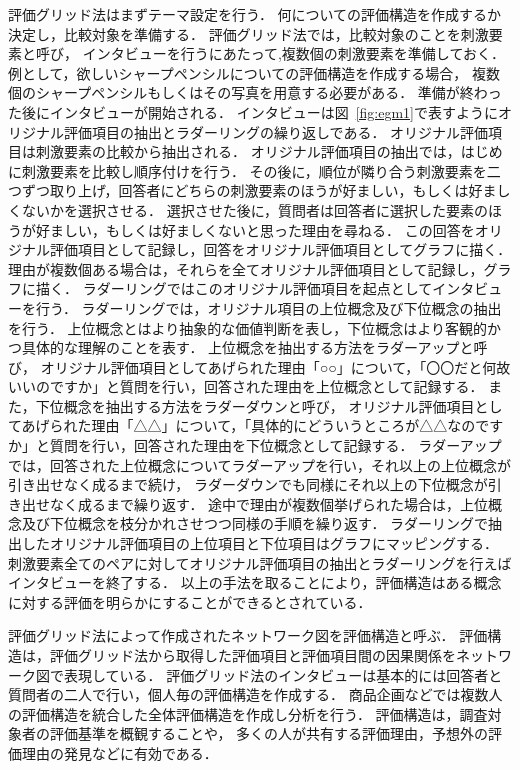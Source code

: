 \documentclass[syuuron]{kuee}
\begin{document}
		評価グリッド法はまずテーマ設定を行う．
		何についての評価構造を作成するか決定し，比較対象を準備する．
		評価グリッド法では，比較対象のことを刺激要素と呼び，
		インタビューを行うにあたって,複数個の刺激要素を準備しておく．
		例として，欲しいシャープペンシルについての評価構造を作成する場合，
		複数個のシャープペンシルもしくはその写真を用意する必要がある．
		準備が終わった後にインタビューが開始される．
		インタビューは図~\ref{fig:egm1}で表すようにオリジナル評価項目の抽出とラダーリングの繰り返しである．
		オリジナル評価項目は刺激要素の比較から抽出される．
		オリジナル評価項目の抽出では，はじめに刺激要素を比較し順序付けを行う．
		その後に，順位が隣り合う刺激要素を二つずつ取り上げ，回答者にどちらの刺激要素のほうが好ましい，もしくは好ましくないかを選択させる．
		選択させた後に，質問者は回答者に選択した要素のほうが好ましい，もしくは好ましくないと思った理由を尋ねる．
		この回答をオリジナル評価項目として記録し，回答をオリジナル評価項目としてグラフに描く．
		理由が複数個ある場合は，それらを全てオリジナル評価項目として記録し，グラフに描く．
		ラダーリングではこのオリジナル評価項目を起点としてインタビューを行う．
		ラダーリングでは，オリジナル項目の上位概念及び下位概念の抽出を行う．
		上位概念とはより抽象的な価値判断を表し，下位概念はより客観的かつ具体的な理解のことを表す．
		上位概念を抽出する方法をラダーアップと呼び，
		オリジナル評価項目としてあげられた理由「○○」について，「〇〇だと何故いいのですか」と質問を行い，回答された理由を上位概念として記録する．
		また，下位概念を抽出する方法をラダーダウンと呼び，
		オリジナル評価項目としてあげられた理由「△△」について，「具体的にどういうところが△△なのですか」と質問を行い，回答された理由を下位概念として記録する．
		ラダーアップでは，回答された上位概念についてラダーアップを行い，それ以上の上位概念が引き出せなく成るまで続け，
		ラダーダウンでも同様にそれ以上の下位概念が引き出せなく成るまで繰り返す．
		途中で理由が複数個挙げられた場合は，上位概念及び下位概念を枝分かれさせつつ同様の手順を繰り返す．
		ラダーリングで抽出したオリジナル評価項目の上位項目と下位項目はグラフにマッピングする．
		刺激要素全てのペアに対してオリジナル評価項目の抽出とラダーリングを行えばインタビューを終了する．
		以上の手法を取ることにより，評価構造はある概念に対する評価を明らかにすることができるとされている．
		
		評価グリッド法によって作成されたネットワーク図を評価構造と呼ぶ．
		評価構造は，評価グリッド法から取得した評価項目と評価項目間の因果関係をネットワーク図で表現している．
		評価グリッド法のインタビューは基本的には回答者と質問者の二人で行い，個人毎の評価構造を作成する．
		商品企画などでは複数人の評価構造を統合した全体評価構造を作成し分析を行う．
		評価構造は，調査対象者の評価基準を概観することや，
		多くの人が共有する評価理由，予想外の評価理由の発見などに有効である．
		
\end{document}
